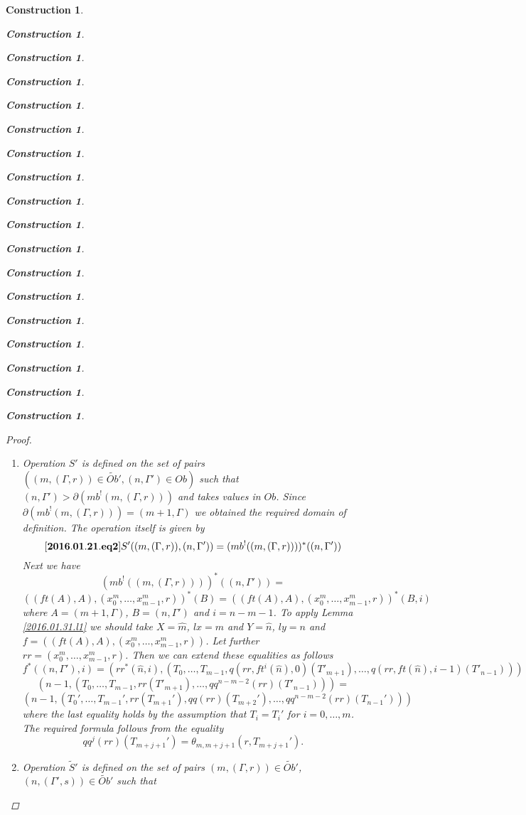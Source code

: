 \documentclass[12pt]{amsart}
\newenvironment{eq}{\begin{equation}}{\end{equation}}
\newtheorem{construction}[proposition]{Construction}
\newcommand{\llabel}[1]{\label{#1}[{\bf #1}]}
\newcommand{\wt}{\widetilde}
\newcommand{\wh}{\widehat}
\begin{document}
\begin{construction}
\begin{construction}
\begin{construction}
\begin{construction}
\begin{construction}
\begin{construction}
\begin{construction}
\begin{construction}
\begin{construction}
\begin{construction}
\begin{construction}
\begin{construction}
\begin{construction}
\begin{construction}
\begin{construction}
\begin{construction}
\begin{construction}
\begin{construction}
\begin{proof}
\begin{enumerate}
To verify the formula for the operation itself consider the equalities:
%
$$\wt{T}'((m,\Gamma),(n,(\Gamma',s)))=mb(p_{(m,\Gamma)}^*(mb^!(n,(\Gamma',s))))=$$
$$mb(p_{(m,\Gamma)}^*((ft((n+1,\Gamma')),((n+1,\Gamma'),(x^{n}_0,\dots,x^{n}_{n-1},s)))))$$
%
where the first equality is by Definition \ref{2015.08.26.def1}(2). By Lemma \ref{2015.09.03.l1} we can extend these equalities as follows:
%
$$mb(p_{(m,\Gamma)}^*((ft((n+1,\Gamma')),((n+1,\Gamma'),(x^{n}_0,\dots,x^{n}_{n-1},s)))))=$$
$$mb(p_{X}^*(ft(Y)),(p_{X}^*(Y),(x^{n+1}_0,\dots,x^{n+1}_{n},(qq^{n-m+1}(\iota^1_{m-1}))(s))))=$$
$$(n+1,(p_{X}^*(Y),\partial_{n}^{m-1}(s)))=(n+1,(T((m,\Gamma),(n+1,\Gamma')),\partial_n^{m-1}(s)))$$
%
where $X=(m,\Gamma)$, $Y=(n+1,\Gamma')$, the first equality is by Lemma \ref{2015.09.03.l1}, the second by Lemma \ref{2015.08.26.l3a} and the third by Definition \ref{2015.08.26.def1}(1). 
%
\item Operation $S'$ is defined on the set of pairs $((m,(\Gamma,r))\in \wt{Ob}',(n,\Gamma')\in Ob)$ such that $(n,\Gamma')>\partial(mb^!(m,(\Gamma,r)))$ and takes values in $Ob$. Since $\partial(mb^!(m,(\Gamma,r)))=(m+1,\Gamma)$ we obtained the required domain of definition. The operation itself is given by
%
\begin{eq}\llabel{2016.01.21.eq2}
S'((m,(\Gamma,r)),(n,\Gamma'))=(mb^!((m,(\Gamma,r))))^*((n,\Gamma'))
\end{eq}
%
Next we have 
%
$$(mb^!((m,(\Gamma,r))))^*((n,\Gamma'))=$$$$((ft(A),A),(x^{m}_0,\dots,x^{m}_{m-1},r))^*(B)=((ft(A),A),(x^{m}_0,\dots,x^{m}_{m-1},r))^*(B,i)$$
where $A=(m+1,\Gamma)$, $B=(n,\Gamma')$ and $i=n-m-1$. To apply Lemma \ref{2016.01.31.l1} we should take $X=\wh{m}$, $lx=m$ and $Y=\wh{n}$, $ly=n$ and $f=((ft(A),A),(x^{m}_0,\dots,x^{m}_{m-1},r))$. Let further $rr=(x^{m}_0,\dots,x^{m}_{m-1},r)$. Then we can extend these equalities as follows
%
$$f^*((n,\Gamma'),i)=(rr^*(\wh{n},i),(T_0,\dots,T_{m-1},q(rr,ft^i(\wh{n}),0)(T'_{m+1}),\dots,q(rr,ft(\wh{n}),i-1)(T'_{n-1})))$$
$$(n-1,(T_0,\dots,T_{m-1},rr(T'_{m+1}),\dots,qq^{n-m-2}(rr)(T'_{n-1})))=$$
$$(n-1,(T_0',\dots,T_{m-1}',rr(T_{m+1}'),qq(rr)(T_{m+2}'),\dots,qq^{n-m-2}(rr)(T_{n-1}')))$$
%
where the last equality holds by the assumption that $T_i=T_i'$ for $i=0,\dots,m$. 
The required formula follows from the equality 
%
$$qq^j(rr)(T_{m+j+1}')=\theta_{m,m+j+1}(r,T_{m+j+1}').$$
%
\item Operation $\wt{S}'$ is defined on the set of pairs $(m,(\Gamma,r))\in \wt{Ob}'$, $(n,(\Gamma',s))\in \wt{Ob}'$ such that 
%

\end{enumerate}
\end{proof}
\end{construction}
\end{construction}
\end{construction}
\end{construction}
\end{construction}
\end{construction}
\end{construction}
\end{construction}
\end{construction}
\end{construction}
\end{construction}
\end{construction}
\end{construction}
\end{construction}
\end{construction}
\end{construction}
\end{construction}
\end{construction}
\end{document}
